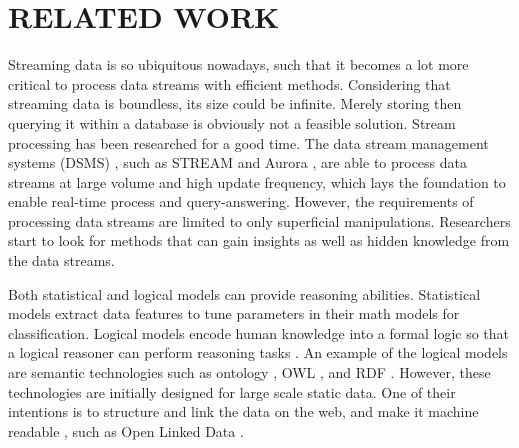 
\chapter{RELATED WORK}
Streaming data is so ubiquitous nowadays, such that it becomes a lot more critical to process data streams with efficient methods.
Considering that streaming data is boundless, its size could be infinite. 
Merely storing then querying it within a database is obviously not a feasible solution.
Stream processing \cite{stephens1997survey} has been researched for a good time.
The data stream management systems (DSMS) \cite{cugola2012processing}, such as STREAM \cite{arasu2003stream} and Aurora \cite{abadi2003aurora}, are able to process data streams at large volume and high update frequency, which lays the foundation to enable real-time process and query-answering. 
However, the requirements of processing data streams are limited to only superficial manipulations.
Researchers start to look for methods that can gain insights as well as hidden knowledge from the data streams.

Both statistical and logical models can provide reasoning abilities. 
Statistical models extract data features to tune parameters in their math models for classification. 
Logical models encode human knowledge into a formal logic so that a logical reasoner can perform reasoning tasks \cite{marek2007reasoning}.
An example of the logical models are semantic technologies such as ontology \cite{noy2001ontology}, OWL \cite{bechhofer2009owl}, and RDF \cite{lassila1999resource}.
However, these technologies are initially designed for large scale static data.
One of their intentions is to structure and link the data on the web, and make it machine readable \cite{berners2001semantic}, such as Open Linked Data \cite{bizer2009linked}.

